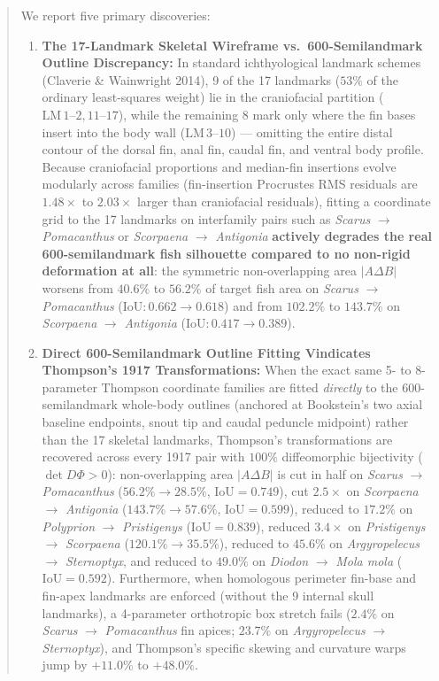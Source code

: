 \documentclass[11pt,a4paper]{article}
\theoremstyle{definition}
\theoremstyle{remark}
\newcommand{\IoU}{\mathrm{IoU}}
\begin{document}
\begin{abstract}
We report five primary discoveries:
\begin{enumerate}
  \item \textbf{The 17-Landmark Skeletal Wireframe vs.\ 600-Semilandmark Outline Discrepancy:} In standard ichthyological landmark schemes (Claverie \& Wainwright 2014), 9 of the 17 landmarks ($53\%$ of the ordinary least-squares weight) lie in the craniofacial partition ($\mathrm{LM}\,1\text{--}2, 11\text{--}17$), while the remaining 8 mark only where the fin bases insert into the body wall ($\mathrm{LM}\,3\text{--}10$) --- omitting the entire distal contour of the dorsal fin, anal fin, caudal fin, and ventral body profile. Because craniofacial proportions and median-fin insertions evolve modularly across families (fin-insertion Procrustes RMS residuals are $1.48\times$ to $2.03\times$ larger than craniofacial residuals), fitting a coordinate grid to the 17 landmarks on interfamily pairs such as \emph{Scarus} $\to$ \emph{Pomacanthus} or \emph{Scorpaena} $\to$ \emph{Antigonia} \textbf{actively degrades the real 600-semilandmark fish silhouette compared to no non-rigid deformation at all}: the symmetric non-overlapping area $|A \Delta B|$ worsens from $40.6\%$ to $56.2\%$ of target fish area on \emph{Scarus} $\to$ \emph{Pomacanthus} ($\IoU: 0.662 \to 0.618$) and from $102.2\%$ to $143.7\%$ on \emph{Scorpaena} $\to$ \emph{Antigonia} ($\IoU: 0.417 \to 0.389$).
  \item \textbf{Direct 600-Semilandmark Outline Fitting Vindicates Thompson's 1917 Transformations:} When the exact same 5- to 8-parameter Thompson coordinate families are fitted \emph{directly} to the 600-semilandmark whole-body outlines (anchored at Bookstein's two axial baseline endpoints, snout tip and caudal peduncle midpoint) rather than the 17 skeletal landmarks, Thompson's transformations are recovered across every 1917 pair with $100\%$ diffeomorphic bijectivity ($\det D\Phi > 0$): non-overlapping area $|A \Delta B|$ is cut in half on \emph{Scarus} $\to$ \emph{Pomacanthus} ($56.2\% \to \mathbf{28.5\%}$, $\IoU = \mathbf{0.749}$), cut $2.5\times$ on \emph{Scorpaena} $\to$ \emph{Antigonia} ($143.7\% \to \mathbf{57.6\%}$, $\IoU = \mathbf{0.599}$), reduced to $\mathbf{17.2\%}$ on \emph{Polyprion} $\to$ \emph{Pristigenys} ($\IoU = \mathbf{0.839}$), reduced $3.4\times$ on \emph{Pristigenys} $\to$ \emph{Scorpaena} ($120.1\% \to \mathbf{35.5\%}$), reduced to $\mathbf{45.6\%}$ on \emph{Argyropelecus} $\to$ \emph{Sternoptyx}, and reduced to $\mathbf{49.0\%}$ on \emph{Diodon} $\to$ \emph{Mola mola} ($\IoU = \mathbf{0.592}$). Furthermore, when homologous perimeter fin-base and fin-apex landmarks are enforced (without the 9 internal skull landmarks), a 4-parameter orthotropic box stretch fails ($2.4\%$ on \emph{Scarus} $\to$ \emph{Pomacanthus} fin apices; $23.7\%$ on \emph{Argyropelecus} $\to$ \emph{Sternoptyx}), and Thompson's specific skewing and curvature warps jump by $+11.0\%$ to $+48.0\%$.

\end{enumerate}
\end{abstract}
\end{document}
